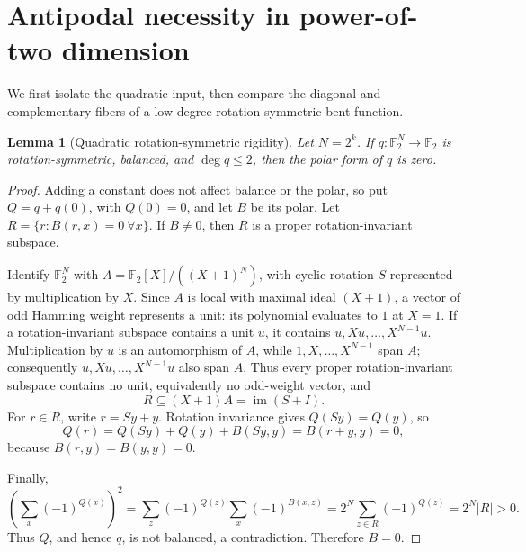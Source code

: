 \documentclass[11pt,a4paper]{article}
\newtheorem{lemma}[theorem]{Lemma}
\theoremstyle{remark}
\theoremstyle{plain}
\newcommand{\F}{\mathbb F_2}
\begin{document}
\section{Antipodal necessity in power-of-two dimension}

We first isolate the quadratic input, then compare the diagonal and complementary fibers of a low-degree rotation-symmetric bent function.

\begin{lemma}[Quadratic rotation-symmetric rigidity]\label{lem:quad-rigidity}
Let \(N=2^k\). If \(q:\F^N\to\F\) is rotation-symmetric, balanced, and \(\deg q\le2\), then the polar form of \(q\) is zero.
\end{lemma}
\begin{proof}
Adding a constant does not affect balance or the polar, so put \(Q=q+q(0)\), with \(Q(0)=0\), and let \(B\) be its polar. Let \(R=\{r:B(r,x)=0\ \forall x\}\). If \(B\ne0\), then \(R\) is a proper rotation-invariant subspace.

Identify \(\F^N\) with \(A=\F[X]/((X+1)^N)\), with cyclic rotation \(S\) represented by multiplication by \(X\). Since \(A\) is local with maximal ideal \((X+1)\), a vector of odd Hamming weight represents a unit: its polynomial evaluates to \(1\) at \(X=1\). If a rotation-invariant subspace contains a unit \(u\), it contains \(u,Xu,\ldots,X^{N-1}u\). Multiplication by \(u\) is an automorphism of \(A\), while \(1,X,\ldots,X^{N-1}\) span \(A\); consequently \(u,Xu,\ldots,X^{N-1}u\) also span \(A\). Thus every proper rotation-invariant subspace contains no unit, equivalently no odd-weight vector, and
\[
R\subseteq (X+1)A=\operatorname{im}(S+I).
\]
For \(r\in R\), write \(r=Sy+y\). Rotation invariance gives \(Q(Sy)=Q(y)\), so
\[
Q(r)=Q(Sy)+Q(y)+B(Sy,y)=B(r+y,y)=0,
\]
because \(B(r,y)=B(y,y)=0\).

Finally,
\[
\left(\sum_x(-1)^{Q(x)}\right)^2
=\sum_{z}(-1)^{Q(z)}\sum_x(-1)^{B(x,z)}
=2^N\sum_{z\in R}(-1)^{Q(z)}
=2^N|R|>0.
\]
Thus \(Q\), and hence \(q\), is not balanced, a contradiction. Therefore \(B=0\).
\end{proof}
\end{document}
